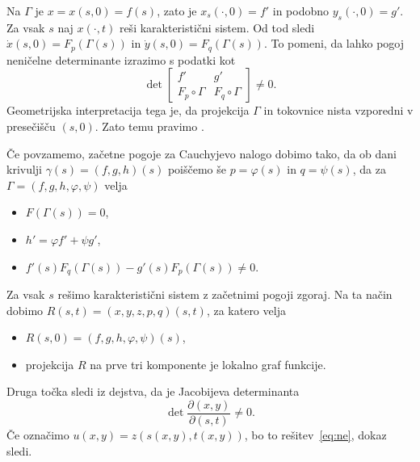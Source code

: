 Na $\Gamma$ je $x = x(s, 0) = f(s)$, zato je $x_s(\cdot, 0) = f'$ in podobno
$y_s(\cdot, 0) = g'$.
Za vsak $s$ naj $x(\cdot, t)$ reši karakteristični sistem.
Od tod sledi $\dot{x}(s,0) = F_p(\Gamma(s))$ in $\dot{y}(s,0) = F_q(\Gamma(s))$.
To pomeni, da lahko pogoj neničelne determinante izrazimo s podatki kot
\[
  \det
  \begin{bmatrix}
	f' & g' \\
	F_p \circ \Gamma & F_q \circ \Gamma
  \end{bmatrix}
  \ne 0.
\]
Geometrijska interpretacija tega je, da projekcija $\Gamma$ in tokovnice nista
vzporedni v presečišču $(s,0)$.
Zato temu pravimo .

Če povzamemo, začetne pogoje za Cauchyjevo nalogo dobimo tako, da ob dani
krivulji $\gamma(s) = (f,g,h)(s)$ poiščemo še $p = \varphi(s)$ in $q = \psi(s)$, da
za $\Gamma = (f,g,h,\varphi,\psi)$ velja
\begin{itemize}
\item $F(\Gamma(s)) = 0$,
\item $h' = \varphi f' + \psi g'$,
\item $f'(s) F_q(\Gamma(s)) - g'(s) F_p(\Gamma(s)) \ne 0$.
\end{itemize}
Za vsak $s$ rešimo karakteristični sistem z začetnimi pogoji zgoraj.
Na ta način dobimo $R(s,t) = (x, y, z, p, q)(s, t)$, za katero velja
\begin{itemize}
\item $R(s,0) = (f,g,h,\varphi,\psi)(s)$,
\item projekcija $R$ na prve tri komponente je lokalno graf funkcije.
\end{itemize}
Druga točka sledi iz dejstva, da je Jacobijeva determinanta
\[
  \det \frac{\partial(x,y)}{\partial(s,t)} \ne 0.
\]
Če označimo $u(x,y) = z(s(x,y), t(x,y))$, bo to rešitev~\eqref{eq:ne}, dokaz
sledi.

